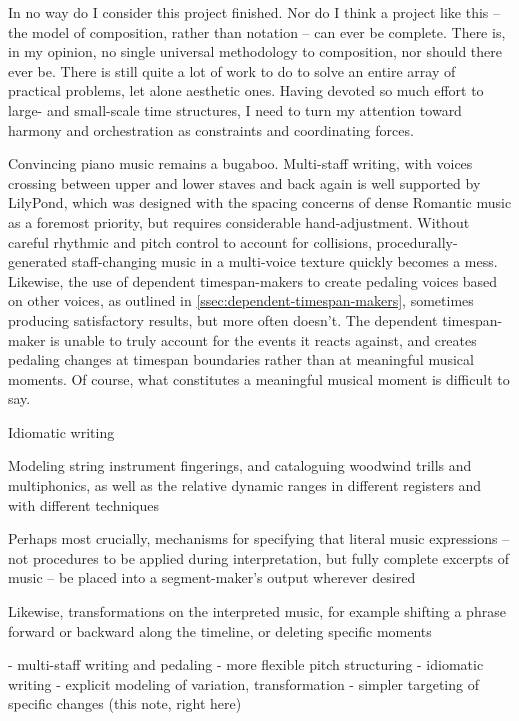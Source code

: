 In no way do I consider this project finished. Nor do I think a project like
this -- the model of composition, rather than notation -- can ever be complete.
There is, in my opinion, no single universal methodology to composition, nor
should there ever be. There is still quite a lot of work to do to solve an
entire array of practical problems, let alone aesthetic ones. Having devoted so
much effort to large- and small-scale time structures, I need to turn my
attention toward harmony and orchestration as constraints and coordinating
forces.

Convincing piano music remains a bugaboo. Multi-staff writing, with voices
crossing between upper and lower staves and back again is well supported by
LilyPond, which was designed with the spacing concerns of dense Romantic music
as a foremost priority, but requires considerable hand-adjustment.
Without careful rhythmic and pitch control to account for collisions,
procedurally-generated staff-changing music in a multi-voice texture quickly
becomes a mess. Likewise, the use of dependent timespan-makers to create
pedaling voices based on other voices, as outlined in
\autoref{ssec:dependent-timespan-makers}, sometimes producing satisfactory
results, but more often doesn't. The dependent timespan-maker is unable to
truly account for the events it reacts against, and creates pedaling changes at
timespan boundaries rather than at meaningful musical moments. Of course, what
constitutes a meaningful musical moment is difficult to say.

Idiomatic writing

Modeling string instrument fingerings, and cataloguing woodwind trills and
multiphonics, as well as the relative dynamic ranges in different registers and
with different techniques

Perhaps most crucially, mechanisms for specifying that literal music
expressions -- not procedures to be applied during interpretation, but fully complete excerpts of
music -- be placed into a segment-maker's output wherever desired 

Likewise, transformations on the interpreted music, for example shifting a
phrase forward or backward along the timeline, or deleting specific moments

\begin{markdown}
-   multi-staff writing and pedaling
-   more flexible pitch structuring
-   idiomatic writing
-   explicit modeling of variation, transformation
-   simpler targeting of specific changes (this note, right here)
\end{markdown}

